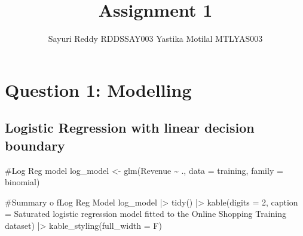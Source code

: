 \documentclass[
  letterpaper,
  DIV=11,
  numbers=noendperiod]{scrartcl}
\title{Assignment 1}
\author{Sayuri Reddy RDDSSAY003 \textbar{} Yastika Motilal MTLYAS003}
\date{}
\newenvironment{Shaded}{\begin{snugshade}}{\end{snugshade}}
\newcommand{\AttributeTok}[1]{\textcolor[rgb]{0.40,0.45,0.13}{#1}}
\newcommand{\CommentTok}[1]{\textcolor[rgb]{0.37,0.37,0.37}{#1}}
\newcommand{\DecValTok}[1]{\textcolor[rgb]{0.68,0.00,0.00}{#1}}
\newcommand{\FunctionTok}[1]{\textcolor[rgb]{0.28,0.35,0.67}{#1}}
\newcommand{\NormalTok}[1]{\textcolor[rgb]{0.00,0.23,0.31}{#1}}
\newcommand{\OtherTok}[1]{\textcolor[rgb]{0.00,0.23,0.31}{#1}}
\newcommand{\SpecialCharTok}[1]{\textcolor[rgb]{0.37,0.37,0.37}{#1}}
\newcommand{\StringTok}[1]{\textcolor[rgb]{0.13,0.47,0.30}{#1}}
\begin{document}
\maketitle


\section{Question 1: Modelling}\label{question-1-modelling}

\subsection{Logistic Regression with linear decision
boundary}\label{logistic-regression-with-linear-decision-boundary}

\begin{Shaded}
\begin{Highlighting}[]
\CommentTok{\#Log Reg model}
\NormalTok{log\_model }\OtherTok{\textless{}{-}} \FunctionTok{glm}\NormalTok{(Revenue }\SpecialCharTok{\textasciitilde{}}\NormalTok{ ., }\AttributeTok{data =}\NormalTok{ training, }\AttributeTok{family =}\NormalTok{ binomial)}

\CommentTok{\#Summary o fLog Reg Model}
\NormalTok{log\_model }\SpecialCharTok{|\textgreater{}} 
  \FunctionTok{tidy}\NormalTok{() }\SpecialCharTok{|\textgreater{}}
  \FunctionTok{kable}\NormalTok{(}\AttributeTok{digits =} \DecValTok{2}\NormalTok{, }\AttributeTok{caption =} \StringTok{\textquotesingle{}Saturated logistic regression model fitted to the Online Shopping Training dataset\textquotesingle{}}\NormalTok{) }\SpecialCharTok{|\textgreater{}}
  \FunctionTok{kable\_styling}\NormalTok{(}\AttributeTok{full\_width =}\NormalTok{ F)}
\end{Highlighting}
\end{Shaded}
\end{document}
